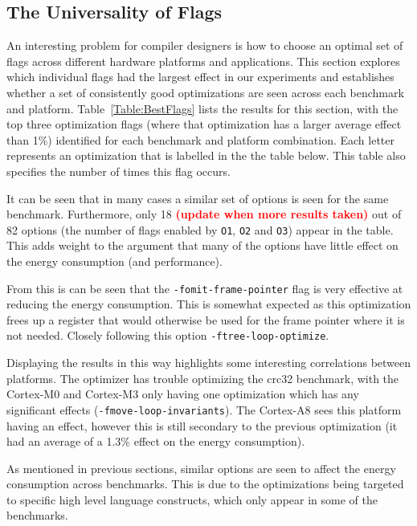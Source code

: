 \documentclass[twocolumn]{article}
\newcommand{\todo}[1]{\textbf{\textcolor{red}{#1}}}
\begin{document}

\subsection{The Universality of Flags}

An interesting problem for compiler designers is how to choose an optimal set of flags across different hardware platforms and applications. This section explores which individual flags had the largest effect in our experiments and establishes whether a set of consistently good optimizations are seen across each benchmark and platform. Table~\ref{Table:BestFlags} lists the results for this section, with the top three optimization flags (where that optimization has a larger average effect than 1\%) identified for each benchmark and platform combination.  Each letter represents an optimization that is labelled in the the table below. This table also specifies the number of times this flag occurs.

It can be seen that in many cases a similar set of options is seen for the same benchmark. Furthermore, only 18 \todo{(update when more results taken)} out of 82 options (the number of flags enabled by \texttt{O1}, \texttt{O2} and \texttt{O3}) appear in the table. This adds weight to the argument that many of the options have little effect on the energy consumption (and performance).

From this is can be seen that the \texttt{-fomit-frame-pointer} flag is very effective at reducing the energy consumption. This is somewhat expected as this optimization frees up a register that would otherwise be used for the frame pointer where it is not needed. Closely following this option \texttt{-ftree-loop-optimize}.

Displaying the results in this way highlights some interesting correlations between platforms. The optimizer has trouble optimizing the crc32 benchmark, with the Cortex-M0 and Cortex-M3 only having one optimization which has any significant effects (\texttt{-fmove-loop-invariants}). The Cortex-A8 sees this platform having an effect, however this is still secondary to the previous optimization (it had an average of a 1.3\% effect on the energy consumption).

As mentioned in previous sections, similar options are seen to affect the energy consumption across benchmarks. This is due to the optimizations being targeted to specific high level language constructs, which only appear in some of the benchmarks.
\end{document}
